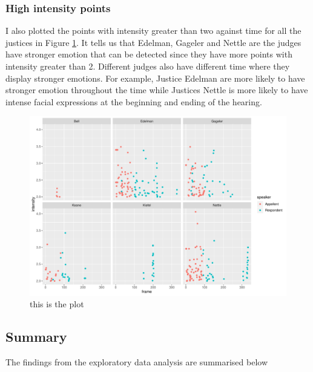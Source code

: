 \documentclass{monashthesis}
\begin{document}
\hypertarget{high-intensity-points}{%
\subsubsection{High intensity points}\label{high-intensity-points}}

I also plotted the points with intensity greater than two against time for all the justices in Figure \ref{fig:high-intensity-points}. It tells us that Edelman, Gageler and Nettle are the judges have stronger emotion that can be detected since they have more points with intensity greater than 2. Different judges also have different time where they display stronger emotions. For example, Justice Edelman are more likely to have stronger emotion throughout the time while Justices Nettle is more likely to have intense facial expressions at the beginning and ending of the hearing.

\begin{figure}

{\centering \includegraphics[width=1\linewidth]{figures/high-intensity-points-1} 

}

\caption{this is the plot}\label{fig:high-intensity-points}
\end{figure}

\hypertarget{summary}{%
\subsection{Summary}\label{summary}}

The findings from the exploratory data analysis are summarised below
\end{document}
